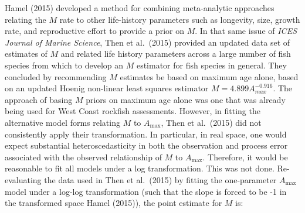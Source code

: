 \documentclass[11pt,
  english,
  a4paper,
]{article}
\begin{document}
Hamel {(2015)\leavevmode\tagmcend\tagstructend} developed a method for combining meta-analytic approaches relating the {\(M\)\leavevmode\tagmcend\tagstructend} rate to other life-history parameters such as longevity, size, growth rate, and reproductive effort to provide a prior on {\(M\)\leavevmode\tagmcend\tagstructend}. In that same issue of \emph{ICES Journal of Marine Science}, Then et al.~{(2015)\leavevmode\tagmcend\tagstructend} provided an updated data set of estimates of {\(M\)\leavevmode\tagmcend\tagstructend} and related life history parameters across a large number of fish species from which to develop an {\(M\)\leavevmode\tagmcend\tagstructend} estimator for fish species in general. They concluded by recommending {\(M\)\leavevmode\tagmcend\tagstructend} estimates be based on maximum age alone, based on an updated Hoenig non-linear least squares estimator {\(M=4.899A^{-0.916}_{max}\)\leavevmode\tagmcend\tagstructend}. The approach of basing {\(M\)\leavevmode\tagmcend\tagstructend} priors on maximum age alone was one that was already being used for West Coast rockfish assessments. However, in fitting the alternative model forms relating {\(M\)\leavevmode\tagmcend\tagstructend} to {\(A_{\text{max}}\)\leavevmode\tagmcend\tagstructend}, Then et al.~{(2015)\leavevmode\tagmcend\tagstructend} did not consistently apply their transformation. In particular, in real space, one would expect substantial heteroscedasticity in both the observation and process error associated with the observed relationship of {\(M\)\leavevmode\tagmcend\tagstructend} to {\(A_{\text{max}}\)\leavevmode\tagmcend\tagstructend}. Therefore, it would be reasonable to fit all models under a log transformation. This was not done. Re-evaluating the data used in Then et al.~{(2015)\leavevmode\tagmcend\tagstructend} by fitting the one-parameter {\(A_{\text{max}}\)\leavevmode\tagmcend\tagstructend} model under a log-log transformation (such that the slope is forced to be -1 in the transformed space Hamel {(2015)\leavevmode\tagmcend\tagstructend}), the point estimate for {\(M\)\leavevmode\tagmcend\tagstructend} is:
\end{document}
